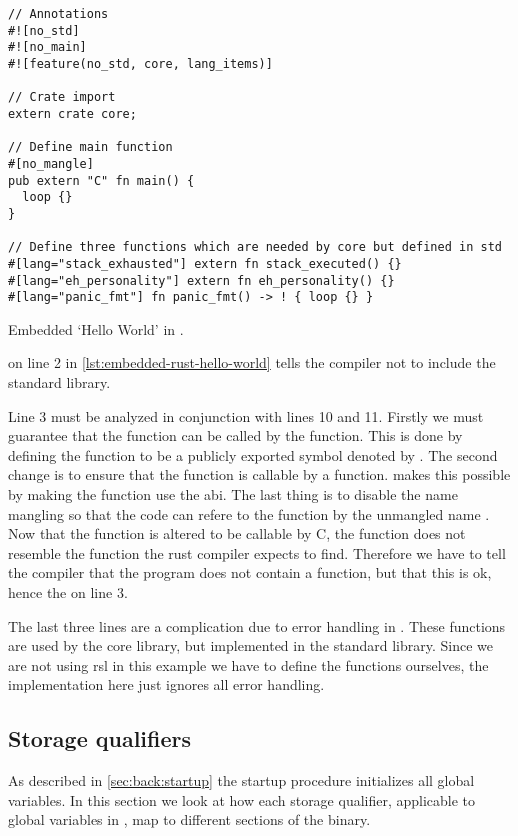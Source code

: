 \begin{listing}[H]
  \begin{verbatim}
// Annotations
#![no_std]
#![no_main]
#![feature(no_std, core, lang_items)]

// Crate import
extern crate core;

// Define main function
#[no_mangle]
pub extern "C" fn main() {
  loop {}
}

// Define three functions which are needed by core but defined in std
#[lang="stack_exhausted"] extern fn stack_executed() {}
#[lang="eh_personality"] extern fn eh_personality() {}
#[lang="panic_fmt"] fn panic_fmt() -> ! { loop {} }
\end{verbatim}
\caption{Embedded `Hello World' in {\rust}.}
\label{lst:embedded-rust-hello-world}
\end{listing}

\attrib{\#\![no\_std]} on line 2 in \autoref{lst:embedded-rust-hello-world} tells the {\rust} compiler not to include the standard library.

Line 3 must be analyzed in conjunction with lines 10 and 11.
Firstly we must guarantee that the function can be called by the  function.
This is done by defining the {\main} function to be a publicly exported symbol denoted by .
The second change is to ensure that the function is callable by a {\C} function.
 makes this possible by making the function use the {\C} \gls{abi}.
The last thing is to disable the {\rust} name mangling so that the {\C} code can refere to the function by the unmangled name {\main}.
Now that the {\main} function is altered to be callable by C, the function does not resemble the function the rust compiler expects to find.
Therefore we have to tell the compiler that the program does not contain a {\main} function, but that this is ok, hence the \attrib{\#\![no\_main]} on line 3.

The last three lines are a complication due to error handling in {\rust}.
These functions are used by the core library, but implemented in the standard library.
Since we are not using \gls{rsl} in this example we have to define the functions ourselves, the implementation here just ignores all error handling.

\subsection{Storage qualifiers}

As described in \autoref{sec:back:startup} the startup procedure initializes all global variables.
In this section we look at how each storage qualifier,  applicable to global variables in {\rust}, map to different sections of the {\elf} binary.

